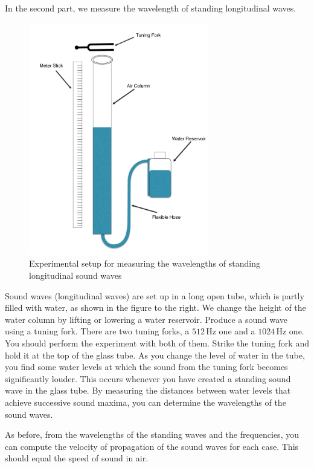 In the second part, we measure the wavelength of standing longitudinal waves. 
\begin{figure}[h]
\centering
\includegraphics[width=0.7\textwidth]{./Exp8/pic/page03.jpg}
\caption{Experimental setup for measuring the wavelengths of standing longitudinal sound waves}
\end{figure} 

Sound waves (longitudinal waves) are set up in a long open tube, which is partly filled with water, as shown in the figure to the right. We change the height of the water column by lifting or lowering a water reservoir. Produce a sound wave using a tuning fork. There are two tuning forks, a $512\, \textrm{Hz}$ one and a $1024\, \textrm{Hz}$ one. You should perform the experiment with both of them. Strike the tuning fork and hold it at the top of the glass tube. As you change the level of water in the tube, you find some water levels at which the sound from the tuning fork becomes significantly louder. This occurs whenever you have created a standing sound wave in the glass tube. By measuring the distances between water levels that achieve successive sound maxima, you can determine the wavelengths of the sound waves. \myskip

As before, from the wavelengths of the standing waves and the frequencies, you can compute the velocity of propagation of the sound waves for each case. This should equal the speed of sound in air.\myskip

